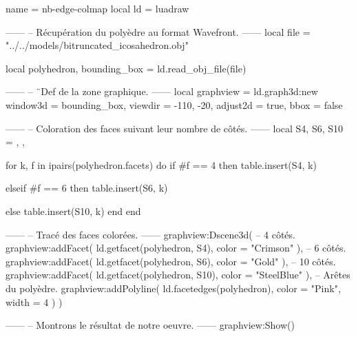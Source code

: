 \documentclass[border = 3pt]{standalone}
\begin{document}
\begin{luadraw*}{name = nb-edge-colmap}
local ld = luadraw

------
-- Récupération du polyèdre au format Wavefront.
------
local file = "../../models/bitruncated_icosahedron.obj"

local polyhedron, bounding_box = ld.read_obj_file(file)

------
-- ¨Def de la zone graphique.
------
local graphview = ld.graph3d:new{
  window3d = bounding_box,
  viewdir  = {-110, -20},
  adjust2d = true,
  bbox     = false
}

------
-- Coloration des faces suivant leur nombre de côtés.
------
local S4, S6, S10 = {}, {}, {}

for k, f in ipairs(polyhedron.facets) do
  if #f == 4 then
    table.insert(S4, k)

  elseif #f == 6 then
    table.insert(S6, k)

  else
    table.insert(S10, k)
  end
end

------
-- Tracé des faces colorées.
------
graphview:Dscene3d(
-- 4 côtés.
  graphview:addFacet(
    ld.getfacet(polyhedron, S4),
    {color = "Crimson"}
  ),
-- 6 côtés.
  graphview:addFacet(
    ld.getfacet(polyhedron, S6),
    {color = "Gold"}
  ),
-- 10 côtés.
  graphview:addFacet(
    ld.getfacet(polyhedron, S10),
    {color = "SteelBlue"}
  ),
-- Arêtes du polyèdre.
  graphview:addPolyline(
    ld.facetedges(polyhedron),
    {
      color = "Pink",
      width = 4
    }
  )
)

------
-- Montrons le résultat de notre oeuvre.
------
graphview:Show()
\end{luadraw*}
\end{document}
